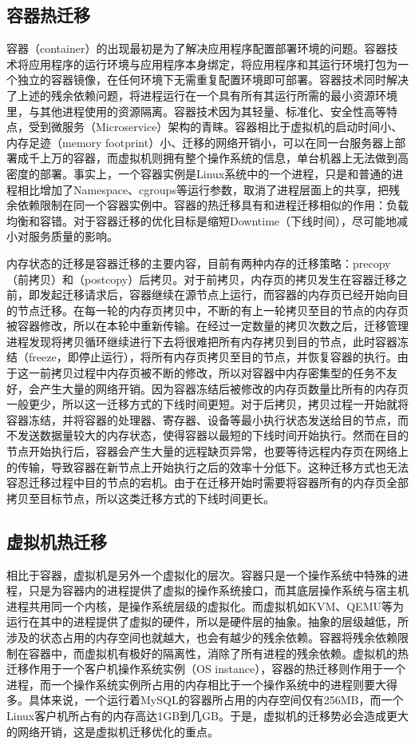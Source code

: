 \subsection{容器热迁移}
\label{chap:containermigration}
容器（container）\cite{container}的出现最初是为了解决应用程序配置部署环境的问题。容器技术将应用程序的运行环境与应用程序本身绑定，将应用程序和其运行环境打包为一个独立的容器镜像，在任何环境下无需重复配置环境即可部署。容器技术同时解决了上述的残余依赖问题，将进程运行在一个具有所有其运行所需的最小资源环境里，与其他进程使用的资源隔离。容器技术因为其轻量、标准化、安全性高等特点，受到微服务（Microservice）架构的青睐。容器相比于虚拟机的启动时间小、内存足迹（memory footprint）小、迁移的网络开销小，可以在同一台服务器上部署成千上万的容器，而虚拟机则拥有整个操作系统的信息，单台机器上无法做到高密度的部署。事实上，一个容器实例是Linux系统中的一个进程，只是和普通的进程相比增加了Namespace、cgroups等运行参数，取消了进程层面上的共享，把残余依赖限制在同一个容器实例中。容器的热迁移\cite{Voyager}具有和进程迁移相似的作用：负载均衡和容错。对于容器迁移的优化目标是缩短Downtime（下线时间），尽可能地减小对服务质量的影响。

内存状态的迁移是容器迁移的主要内容，目前有两种内存的迁移策略：precopy（前拷贝）和（postcopy）后拷贝。对于前拷贝，内存页的拷贝发生在容器迁移之前，即发起迁移请求后，容器继续在源节点上运行，而容器的内存页已经开始向目的节点迁移。在每一轮的内存页拷贝中，不断的有上一轮拷贝至目的节点的内存页被容器修改，所以在本轮中重新传输。在经过一定数量的拷贝次数之后，迁移管理进程发现将拷贝循环继续进行下去将很难把所有内存拷贝到目的节点，此时容器冻结（freeze，即停止运行），将所有内存页拷贝至目的节点，并恢复容器的执行。由于这一前拷贝过程中内存页被不断的修改，所以对容器中内存密集型的任务不友好，会产生大量的网络开销。因为容器冻结后被修改的内存页数量比所有的内存页一般更少，所以这一迁移方式的下线时间更短。对于后拷贝，拷贝过程一开始就将容器冻结，并将容器的处理器、寄存器、设备等最小执行状态发送给目的节点，而不发送数据量较大的内存状态，使得容器以最短的下线时间开始执行。然而在目的节点开始执行后，容器会产生大量的远程缺页异常，也要等待远程内存页在网络上的传输，导致容器在新节点上开始执行之后的效率十分低下。这种迁移方式也无法容忍迁移过程中目的节点的宕机。由于在迁移开始时需要将容器所有的内存页全部拷贝至目标节点，所以这类迁移方式的下线时间更长。

\subsection{虚拟机热迁移}
相比于容器，虚拟机是另外一个虚拟化的层次。容器只是一个操作系统中特殊的进程，只是为容器内的进程提供了虚拟的操作系统接口，而其底层操作系统与宿主机进程共用同一个内核，是操作系统层级的虚拟化。而虚拟机如KVM、QEMU等为运行在其中的进程提供了虚拟的硬件，所以是硬件层的抽象。抽象的层级越低，所涉及的状态占用的内存空间也就越大，也会有越少的残余依赖。容器将残余依赖限制在容器中，而虚拟机有极好的隔离性，消除了所有进程的残余依赖。虚拟机的热迁移作用于一个客户机操作系统实例（OS instance），容器的热迁移则作用于一个进程，而一个操作系统实例所占用的内存相比于一个操作系统中的进程则要大得多。具体来说，一个运行着MySQL的容器所占用的内存空间仅有256MB\cite{Voyager}，而一个Linux客户机所占有的内存高达1GB到几GB。于是，虚拟机的迁移势必会造成更大的网络开销，这是虚拟机迁移优化的重点。

